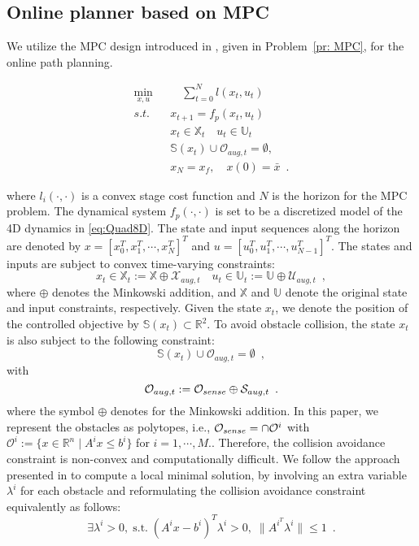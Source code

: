 \subsection{Online planner based on MPC}
%
We utilize the MPC design introduced in \cite{zhang_2017_MPC}, given in Problem~\ref{pr: MPC}, for the online path planning.
%
\begin{problem}\label{pr: MPC}
\begin{align*}
\min_{x,u}  & \quad \sum^{N}_{t=0} l(x_t,u_t)  \\
s.t. \quad &x_{t+1} = f_p(x_t,u_t)\\
& x_t \in \mathbb{X}_t\quad u_t \in \mathbb{U}_t\\
& \mathbb{S}(x_t)\cup\mathcal{O}_{aug,t} = \emptyset,\\
& x_N = x_f ,\quad x(0) = \bar{x} \enspace.
\end{align*}
\end{problem}
\noindent where $l_i(\cdot,\cdot)$ is a  convex stage cost function and $N$ is the horizon for the MPC problem. The dynamical system $f_p(\cdot,\cdot)$ is set to be a discretized model of the 4D dynamics in \ref{eq:Quad8D}. The state and input sequences along the horizon  are denoted by $x=[x^{T}_0,x^{T}_1,\cdots,x^{T}_N]^{T}$ and $u=[u^{T}_0,u^{T}_1,\cdots,u^{T}_{N-1}]^{T}$. The states and inputs are subject to convex time-varying constraints:
%
\begin{equation}
x_t \in \mathbb{X}_t :=\mathbb{X}\oplus\mathcal{X}_{aug,t} \quad u_t \in\mathbb{U}_t := \mathbb{U}\oplus\mathcal{U}_{aug,t} \enspace ,
\end{equation}
%
where $\oplus$ denotes the Minkowski addition, and $\mathbb{X}$ and $\mathbb{U}$ denote the original state and input constraints, respectively. Given the state $x_t$, we denote the position of the controlled objective by $\mathbb{S}(x_t)\subset \mathbb{R}^{2}$. To avoid obstacle collision, the state $x_t$ is also subject to the following constraint: 
%
\begin{equation}
\mathbb{S}(x_t)\cup\mathcal{O}_{aug,t} = \emptyset \enspace ,
\end{equation}
%
with 
%
\begin{equation}
\mathcal{O}_{aug,t} := \mathcal{O}_{sense}\oplus\mathcal{S}_{aug,t} \enspace .
\end{equation}
%
where the symbol $\oplus$ denotes for the Minkowski addition.
%
In this paper, we represent the obstacles as polytopes, i.e., $\mathcal{O}_{sense} = \cap \mathcal{O}^{i}$ with $\mathcal{O}^{i}:= \{x\in\mathbb{R}^{n} \mid A^{i}x\leq b^{i}\}$ for $i = 1,\cdots ,M.$. Therefore, the collision avoidance constraint is non-convex and computationally difficult. We follow the approach presented in \cite{zhang_2017_MPC} to compute a local minimal solution, by involving an extra variable $\lambda^{i}$ for each obstacle and reformulating the collision avoidance constraint equivalently as follows: 
%
\begin{equation}
\exists \lambda^{i} >0, \; \mbox{s.t.} \; (A^{i}x- b^{i})^{T}\lambda^{i}  > 0, \; \|A^{i^{T}}\lambda^{i}\|\leq 1\enspace .
\end{equation}
%
